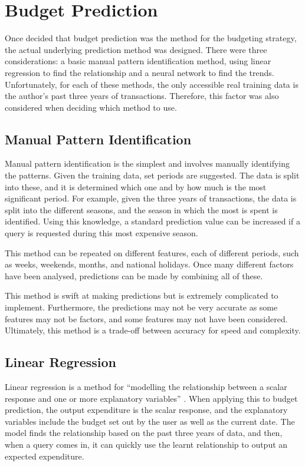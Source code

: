 \section{Budget Prediction}
\label{sec:BudgetPrediction}
Once decided that budget prediction was the method for the budgeting strategy, the actual underlying prediction method was designed. There were three considerations: a basic manual pattern identification method, using linear regression to find the relationship and a neural network to find the trends. Unfortunately, for each of these methods, the only accessible real training data is the author's past three years of transactions. Therefore, this factor was also considered when deciding which method to use.

\subsection{Manual Pattern Identification}
Manual pattern identification is the simplest and involves manually identifying the patterns. Given the training data, set periods are suggested. The data is split into these, and it is determined which one and by how much is the most significant period. For example, given the three years of transactions, the data is split into the different seasons, and the season in which the most is spent is identified. Using this knowledge, a standard prediction value can be increased if a query is requested during this most expensive season.

This method can be repeated on different features, each of different periods, such as weeks, weekends, months, and national holidays. Once many different factors have been analysed, predictions can be made by combining all of these.

This method is swift at making predictions but is extremely complicated to implement. Furthermore, the predictions may not be very accurate as some features may not be factors, and some features may not have been considered. Ultimately, this method is a trade-off between accuracy for speed and complexity.

\subsection{Linear Regression}
Linear regression is a method for ``modelling the relationship between a scalar response and one or more explanatory variables'' \cite{LinearRegressionWiki}. When applying this to budget prediction, the output expenditure is the scalar response, and the explanatory variables include the budget set out by the user as well as the current date. The model finds the relationship based on the past three years of data, and then, when a query comes in, it can quickly use the learnt relationship to output an expected expenditure.

